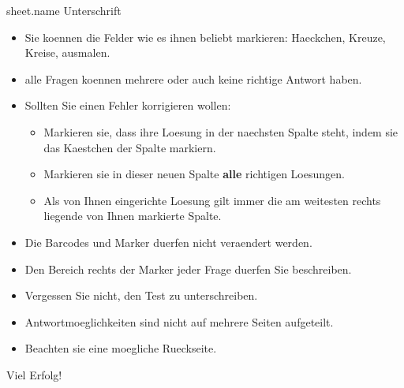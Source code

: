 \documentclass{extarticle}
\begin{document}
\pagestyle{scrheadings}


{%


\iffalse
{{ sheet.json_readable }}
\fi


\begin{wrapfigure}{r}{ {{common.main_qr_width}} }
\texttt{[image: \{ '\{']}}{{ sheet.qr }}}
\end{wrapfigure}

    { \large {{ sheet.name}}} Unterschrift \fbox{\hspace{50mm}\vspace{20mm}}

    \begin{itemize}
    \item Sie koennen die Felder wie es ihnen beliebt markieren: Haeckchen, Kreuze, Kreise, ausmalen.
    \item alle Fragen koennen mehrere oder auch keine richtige Antwort haben.
    
    \item Sollten Sie einen Fehler korrigieren wollen:
    \begin{itemize}
    \item Markieren sie, dass ihre Loesung in der naechsten Spalte steht, indem sie das Kaestchen der Spalte markiern.
    \item Markieren sie in dieser neuen Spalte \textbf{alle} richtigen Loesungen.
    \item Als von Ihnen eingerichte Loesung gilt immer die am weitesten rechts liegende von Ihnen markierte Spalte.
    \end{itemize}
    \item Die Barcodes und Marker duerfen nicht veraendert werden.
    \item Den Bereich rechts der Marker jeder Frage duerfen Sie beschreiben.
    \item Vergessen Sie nicht, den Test zu unterschreiben.
    \item Antwortmoeglichkeiten sind nicht auf mehrere Seiten aufgeteilt.
    \item Beachten sie eine moegliche Rueckseite.
\end{itemize}

Viel Erfolg!





\begin{longtable}[l]{r |  c c c | l }


\end{longtable}}
\end{document}
